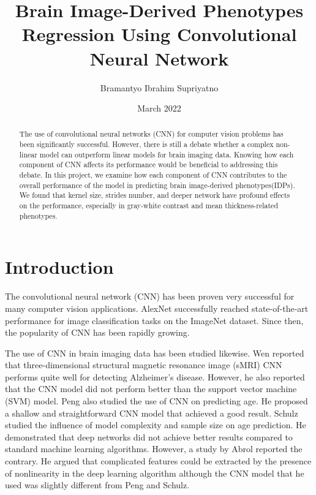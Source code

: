 \documentclass{article}
\title{Brain Image-Derived Phenotypes Regression Using Convolutional Neural Network}
\author{Bramantyo Ibrahim Supriyatno}
\date{March 2022}
\begin{document}
    \maketitle
    \begin{abstract}
        The use of convolutional neural networks (CNN) for computer vision problems has been significantly successful. 
        However, there is still a debate whether a complex non-linear model can outperform linear models for brain imaging data. 
        Knowing how each component of CNN affects its performance would be beneficial to addressing this debate. 
        In this project, we examine how each component of CNN contributes to the overall performance of the model in predicting brain image-derived phenotypes(IDPs). 
        We found that kernel size, strides number, and deeper network have profound effects on the performance, especially in gray-white contrast and mean thickness-related phenotypes.
    \end{abstract}
    
    \section*{Introduction}
    The convolutional neural network (CNN) has been proven very successful for many computer vision applications. 
    AlexNet\cite{alexnet} successfully reached state-of-the-art performance for image classification tasks on the ImageNet dataset. 
    Since then, the popularity of CNN has been rapidly growing.
    
    The use of CNN in brain imaging data has been studied likewise. 
    Wen\cite{wen} reported that three-dimensional structural magnetic resonance image (sMRI) CNN performs quite well for detecting Alzheimer's disease. 
    However, he also reported that the CNN model did not perform better than the support vector machine (SVM) model. 
    Peng\cite{peng} also studied the use of CNN on predicting age. He proposed a shallow and straightforward CNN model that achieved a good result. 
    Schulz\cite{schulz} studied the influence of model complexity and sample size on age prediction. 
    He demonstrated that deep networks did not achieve better results compared to standard machine learning algorithms. 
    However, a study by Abrol\cite{abrol} reported the contrary. 
    He argued that complicated features could be extracted by the presence of nonlinearity in the deep learning algorithm  
    although the CNN model that he used was slightly different from Peng and Schulz. 
        
\end{document}

